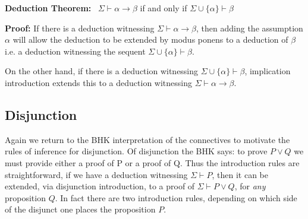 \documentclass{book}
\begin{document}
    {\bf Deduction Theorem:} \ $\Sigma \vdash \alpha \rightarrow \beta$ if and only if $\Sigma \cup \{\alpha\} \vdash \beta$

	{\bf Proof:} If there is a deduction witnessing $\Sigma \vdash \alpha \rightarrow \beta$, then adding the assumption $\alpha$ will allow the deduction to be extended by modus ponens to a deduction of $\beta$ i.e. a deduction witnessing the sequent $\Sigma \cup \{\alpha\} \vdash \beta$. 

    On the other hand, if there is a deduction witnessing $\Sigma \cup \{\alpha\} \vdash \beta$, implication introduction extends this to a deduction witnessing $\Sigma \vdash \alpha \rightarrow \beta$.

    
    \newpage
    \subsection{Disjunction}

    Again we return to the BHK interpretation of the connectives to motivate the rules of inference for disjunction. Of disjunction the BHK says: to prove $P \lor Q$  we must provide either a proof of P or a proof of Q. Thus the introduction rules are straightforward, if we have a deduction witnessing $\Sigma \vdash P$, then it can be extended, via disjunction introduction, to a proof of $\Sigma \vdash P \lor Q$, for \emph{any} proposition $Q$. In fact there are two introduction rules, depending on which side of the disjunct one places the proposition $P$. 

    \vspace{0.1cm}
\end{document}
